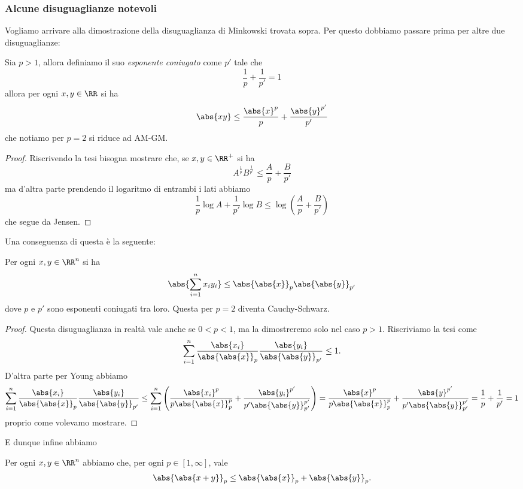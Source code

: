 \documentclass[11pt]{scrartcl}
\begin{document}
	\subsubsection{Alcune disuguaglianze notevoli}
	Vogliamo arrivare alla dimostrazione della disuguaglianza di Minkowski trovata sopra. Per questo dobbiamo passare prima per altre due disuguaglianze:
	\begin{proposition}
		Sia $p>1$, allora definiamo il suo \textit{esponente coniugato} come $p'$ tale che 
		$$\frac{1}{p}+\frac{1}{p'}=1$$
		allora per ogni $x,y\in \RR$ si ha
		$$\abs{xy}\le \frac{\abs{x}^p}{p}+\frac{\abs{y}^{p'}}{p'}$$
		che notiamo per $p=2$ si riduce ad AM-GM.
	\end{proposition}
	\begin{proof}
		Riscrivendo la tesi bisogna mostrare che, se $x,y\in \RR^+$ si ha
		$$A^{\frac{1}{p}}B^{\frac{1}{p'}}\le \frac{A}{p}+\frac{B}{p'}$$
		ma d'altra parte prendendo il logaritmo di entrambi i lati abbiamo
		$$\frac{1}{p}\log A+\frac{1}{p'}\log B\le \log\left(\frac{A}{p}+\frac{B}{p'}\right)$$
		che segue da Jensen.
	\end{proof}
	Una conseguenza di questa è la seguente:
	\begin{proposition}
		Per ogni $x,y\in \RR^n$ si ha
		$$\abs{\sum_{i=1}^{n}x_iy_i}\le \abs{\abs{x}}_p\abs{\abs{y}}_{p'}$$
		dove $p$ e $p'$ sono esponenti coniugati tra loro. Questa per $p=2$ diventa Cauchy-Schwarz. 
	\end{proposition}
	\begin{proof}
		Questa disuguaglianza in realtà vale anche se $0<p<1$, ma la dimostreremo solo nel caso $p>1$. Riscriviamo la tesi come
		$$\sum_{i=1}^{n}\frac{\abs{x_i}}{\abs{\abs{x}}_p}\frac{\abs{y_i}}{\abs{\abs{y}}_{p'}}\le 1.$$
		D'altra parte per Young abbiamo
		$$\sum_{i=1}^{n}\frac{\abs{x_i}}{\abs{\abs{x}}_p}\frac{\abs{y_i}}{\abs{\abs{y}}_{p'}}\le \sum_{i=1}^{n}\left(\frac{\abs{x_i}^p}{p\abs{\abs{x}}_p^p}+\frac{\abs{y_i}^{p'}}{p'\abs{\abs{y}}_{p'}^{p'}}\right)=\frac{\abs{x}^p}{p\abs{\abs{x}}_p^p}+\frac{\abs{y}^{p'}}{p'\abs{\abs{y}}_{p'}^{p'}}=\frac{1}{p}+\frac{1}{p'}=1$$
		proprio come volevamo mostrare.
	\end{proof}
	E dunque infine abbiamo
	\begin{proposition}
		Per ogni $x,y\in \RR^n$ abbiamo che, per ogni $p\in [1,\infty]$, vale
		$$\abs{\abs{x+y}}_p\le \abs{\abs{x}}_p+\abs{\abs{y}}_p.$$
	\end{proposition}
\end{document}
